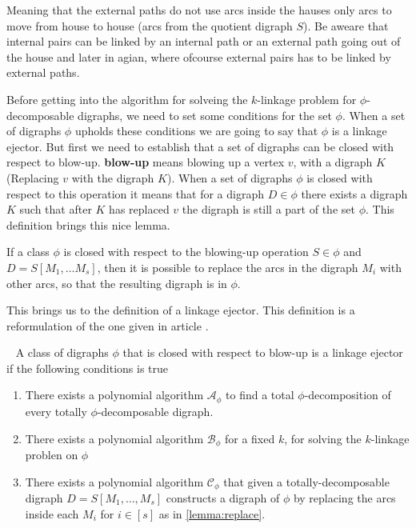 Meaning that the external paths do not use arcs inside the hauses only arcs to move from house to house (arcs from the quotient digraph $S$). Be aweare that internal pairs can be linked by an internal path or an external path going out of the house and later in agian, where ofcourse external pairs has to be linked by external paths. 

Before getting into the algorithm for solveing the $k$-linkage problem for $\phi$-decomposable digraphs, we need to set some conditions for the set $\phi$. 
When a set of digraphs $\phi$ upholds these conditions we are going to say that $\phi$ is a linkage ejector. 
But first we need to establish that a set of digraphs can be closed with respect to blow-up.
\textbf{blow-up} means blowing up a vertex $v$, with a digraph $K$(Replacing $v$ with the digraph $K$).
When a set of digraphs $\phi$ is closed with respect to this operation it means that for a digraph $D\in \phi$ there exists a digraph $K$ such that after $K$ has replaced $v$ the digraph is still a part of the set $\phi$. 
This definition brings this nice lemma.

\begin{lemma}
    If a class $\phi$ is closed with respect to the blowing-up operation $S\in \phi$ and $D=S[M_1,\dots M_s]$, then it is possible to replace the arcs in the digraph $M_i$ with other arcs, so that the resulting digraph is in $\phi$. 
    \label{lemma:replace} 
\end{lemma}

This brings us to the definition of a linkage ejector. This definition is a reformulation of the one given in article \cite{bangJGT85}.
\begin{definition}~\cite{bangJGT85}
    A class of digraphs $\phi$ that is closed with respect to blow-up is a linkage ejector if the following conditions is true
    \begin{enumerate}
        \item There exists a polynomial algorithm $\mathcal{A}_{\phi}$ to find a total $\phi$-decomposition of every totally $\phi$-decomposable digraph.
        \item There exists a polynomial algorithm $\mathcal{B}_{\phi}$ for a fixed $k$, for solving the $k$-linkage problen on $\phi$
        \item There exists a polynomial algorithm $\mathcal{C}_{\phi}$ that given a totally-decomposable digraph $D=S[M_1,\dots , M_s]$ constructs a digraph of $\phi$ by replacing the arcs inside each $M_i$ for $i\in [s]$ as in \autoref{lemma:replace}. 
    \end{enumerate}
    \label{def:ejector}
\end{definition}

